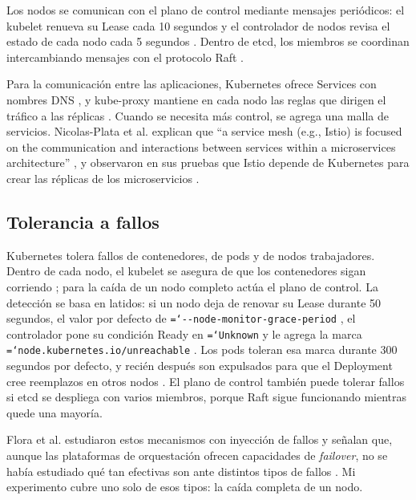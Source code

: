 \documentclass[11pt,a4paper]{article}
\newcommand{\cmd}[1]{\texttt{\hyphenchar\font=`\-\relax #1}}
\begin{document}
Los nodos se comunican con el plano de control mediante mensajes periódicos: el kubelet renueva su Lease cada 10 segundos \cite{k8s_kubelet} y el controlador de nodos revisa el estado de cada nodo cada 5 segundos \cite{k8s_nodes}. Dentro de etcd, los miembros se coordinan intercambiando mensajes con el protocolo Raft \cite{etcd_api}.

Para la comunicación entre las aplicaciones, Kubernetes ofrece Services con nombres DNS \cite{k8s_dns}, y kube-proxy mantiene en cada nodo las reglas que dirigen el tráfico a las réplicas \cite{k8s_components}. Cuando se necesita más control, se agrega una malla de servicios. Nicolas-Plata et al. explican que \foreignquote{american}{a service mesh (e.g., Istio) is focused on the communication and interactions between services within a microservices architecture} \cite[p.~7431]{nicolasplata2024}, y observaron en sus pruebas que Istio depende de Kubernetes para crear las réplicas de los microservicios \cite[p.~7435]{nicolasplata2024}.

\subsection{Tolerancia a fallos}

Kubernetes tolera fallos de contenedores, de pods y de nodos trabajadores. Dentro de cada nodo, el kubelet se asegura de que los contenedores sigan corriendo \cite{k8s_components}; para la caída de un nodo completo actúa el plano de control. La detección se basa en latidos: si un nodo deja de renovar su Lease durante 50 segundos, el valor por defecto de \cmd{-{}-node-monitor-grace-period} \cite{k8s_kcm}, el controlador pone su condición Ready en \cmd{Unknown} y le agrega la marca \cmd{node.kubernetes.io/\allowbreak unreachable} \cite{k8s_nodes,k8s_taints}. Los pods toleran esa marca durante 300 segundos por defecto, y recién después son expulsados para que el Deployment cree reemplazos en otros nodos \cite{k8s_taints}. El plano de control también puede tolerar fallos si etcd se despliega con varios miembros, porque Raft sigue funcionando mientras quede una mayoría.

Flora et al. estudiaron estos mecanismos con inyección de fallos y señalan que, aunque las plataformas de orquestación ofrecen capacidades de \emph{failover}, no se había estudiado qué tan efectivas son ante distintos tipos de fallos \cite{flora2022}. Mi experimento cubre uno solo de esos tipos: la caída completa de un nodo.
\end{document}
